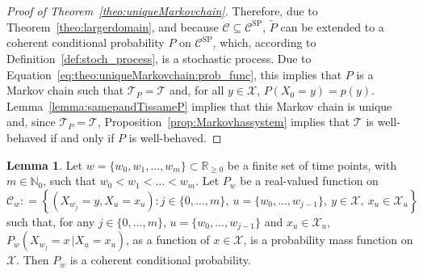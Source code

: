 \documentclass[10pt,a4paper]{paper}
\theoremstyle{definition}
\newtheorem{lemma}[theorem]{Lemma}
\newcommand{\nats}{\mathbb{N}}
\newcommand{\reals}{\mathbb{R}}
\newcommand{\states}{\mathcal{X}}
\newcommand{\coloneqq}{:\!=}
\begin{document}
\begin{proof}[Proof of Theorem~\ref{theo:uniqueMarkovchain}]
Therefore, due to Theorem~\ref{theo:largerdomain}, and because $\mathcal{C}\subseteq\mathcal{C}^\mathrm{SP}$, $\tilde{P}$ can be extended to a coherent conditional probability $P$ on $\mathcal{C}^\mathrm{SP}$, which, according to Definition~\ref{def:stoch_process}, is a stochastic process. Due to Equation~\eqref{eq:theo:uniqueMarkovchain:prob_func}, this implies that $P$ is a Markov chain such that $\mathcal{T}_P=\mathcal{T}$ and, for all $y\in\states$, $P(X_0=y)=p(y)$. Lemma~\ref{lemma:samepandTissameP} implies that this Markov chain is unique and, since $\mathcal{T}_P=\mathcal{T}$, Proposition~\ref{prop:Markovhassystem} implies that $\mathcal{T}$ is well-behaved if and only if $P$ is well-behaved.
\end{proof}

\begin{lemma}\label{lemma:simplechaincoherence}
Let $w=\{w_0,w_1,\dots,w_m\}\subset\reals_{\geq0}$ be a finite set of time points, with $m\in\nats_0$, such that $w_0<w_1<\dots<w_m$.
Let $P_w$ be a real-valued function on
\begin{equation*}
\mathcal{C}_w\coloneqq
\left\{
(X_{w_j}=y,X_u=x_u)
\colon 
j\in\{0,\dots,m\},~
u=\{w_0,\dots,w_{j-1}\},~
y\in\states,~
x_u\in\states_u
\right\}
\end{equation*}
such that, for any $j\in\{0,\dots,m\}$, $u=\{w_0,\dots,w_{j-1}\}$ and $x_u\in\states_u$, $P_w(X_{w_j}=x\,\vert X_u=x_u)$, as a function of $x\in\states$, is a probability mass function on $\states$. Then $P_w$ is a coherent conditional probability.%
\end{lemma}
\end{document}
